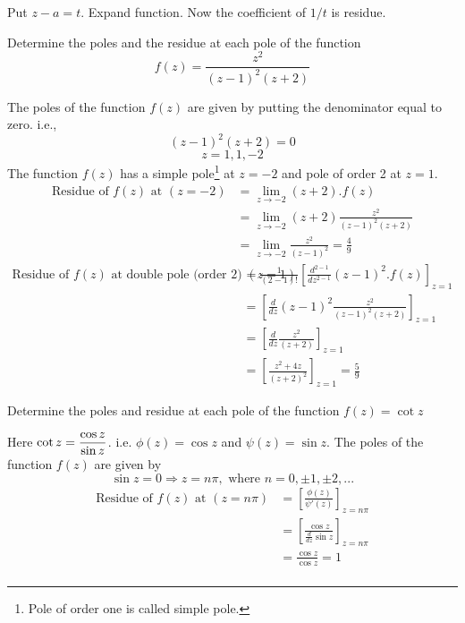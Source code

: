  Put $z-a = t$. Expand function. Now the coefficient of $1/t$ is residue.
 \begin{example}
 Determine the poles and the residue at each pole of the function
 \[f(z) = \frac{z^2}{(z-1)^2(z+2)}\]
 \end{example}
 \begin{solution}
 The poles of the function $f(z)$ are given by putting the denominator equal to zero. i.e.,
 \[(z-1)^2(z+2) = 0\]
 \[z = 1, 1, -2\]
 The function $f(z)$ has a simple pole\footnote{Pole of order one is called simple pole.}  at $z=-2$ and pole of order 2 at $z=1$.
 \begin{align*}
	\text{Residue of $f(z)$ at $(z=-2)$} &= \lim_{z\rightarrow -2} (z+2).f(z)\\
	 &=\lim_{z\rightarrow -2} (z+2)\frac{z^2}{(z-1)^2(z+2)}\\
	 &=\lim_{z\rightarrow -2} \frac{z^2}{(z-1)^2} = \frac{4}{9}
\end{align*}
 \begin{align*}
	\text{Residue of $f(z)$ at double pole (order 2) $(z=1)$} &= \frac{1}{(2-1)!}\left[{\frac{d^{2-1}}{dz^{2-1}}}(z-1)^2.f(z)\right]_{z=1}\\
	&= \left[\frac{d}{dz}(z-1)^2\frac{z^2}{(z-1)^2(z+2)}\right]_{z=1}\\
	&= \left[\frac{d}{dz}\frac{z^2}{(z+2)}\right]_{z=1}\\
	&= \left[\frac{z^2+4z}{(z+2)^2}\right]_{z=1} = \frac{5}{9}
\end{align*}
 \end{solution}
\begin{example}
Determine the poles and residue at each pole of the function $f(z)=\cot z$
\end{example}
\begin{solution}
Here $\displaystyle \cot z = \frac{\cos z}{\sin z}$. i.e. $\phi(z) = \cos z$ and $\psi(z) = \sin z$. The poles of the function $f(z)$ are given by 
\[\sin z = 0 \Rightarrow z=n\pi, \text{ where } n=0,\pm 1, \pm 2, ...\]
\begin{align*}
	\text{Residue of $f(z)$ at $(z=n\pi)$} &= \left[\frac{\phi (z)}{\psi' (z)}\right]_{z=n\pi}\\
	&= \left[\frac{\cos z}{\frac{d}{dz}\sin z}\right]_{z=n\pi} \\
	&=\frac{\cos z}{\cos z} = 1\\
\end{align*}
\end{solution}

